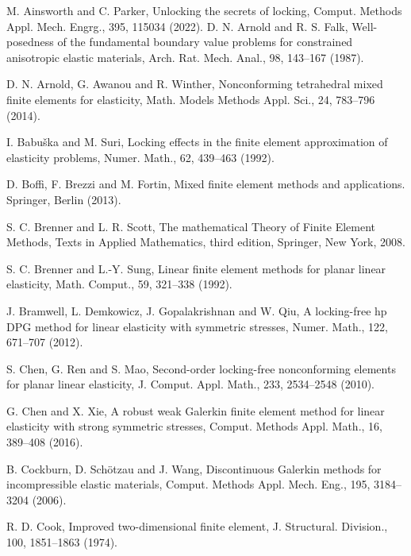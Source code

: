 \documentclass[11pt]{article}
\numberwithin{equation}{section}
\begin{document}
\begin{thebibliography}{99.}
 M. Ainsworth and C. Parker, Unlocking the secrets of locking, Comput. Methods
Appl. Mech. Engrg., 395, 115034 (2022).
 D. N.  Arnold and R. S.  Falk,  Well-posedness of the fundamental boundary value problems for constrained anisotropic elastic materials, Arch. Rat. Mech. Anal., 98, 143--167 (1987). 

 D. N. Arnold, G. Awanou and  R. Winther, Nonconforming tetrahedral mixed finite elements for elasticity, Math. Models Methods Appl. Sci., 24, 783--796 (2014).

  I. Babuška and M. Suri, Locking effects in the finite element approximation of elasticity
problems, Numer. Math., 62, 439--463 (1992).

 D. Boffi, F. Brezzi and  M. Fortin, Mixed finite element methods and applications. Springer, Berlin (2013).

 S. C. Brenner and L. R. Scott, The mathematical Theory of Finite Element Methods, Texts in Applied Mathematics, third edition, Springer, New York, 2008.

 S. C. Brenner and  L.-Y. Sung, Linear finite element methods for planar linear elasticity, Math. Comput., 59, 321--338 (1992).

 J. Bramwell, L. Demkowicz, J. Gopalakrishnan and  W. Qiu, A locking-free hp DPG method for linear elasticity with symmetric stresses, Numer. Math., 122, 671--707 (2012). 

 S. Chen, G. Ren and  S. Mao, Second-order locking-free nonconforming elements for planar linear elasticity, J. Comput. Appl. Math., 233, 2534--2548 (2010).

 G. Chen and  X. Xie, A robust weak Galerkin finite element method for linear elasticity with strong symmetric stresses, Comput. Methods Appl. Math., 16, 389--408 (2016).

 B. Cockburn, D. Schötzau and J. Wang, Discontinuous Galerkin methods for incompressible elastic materials, Comput. Methods Appl. Mech. Eng., 195, 3184--3204 (2006).

 R. D. Cook,  Improved two-dimensional finite element, J. Structural. Division., 100, 1851--1863 (1974).


\end{thebibliography}
\end{document}
